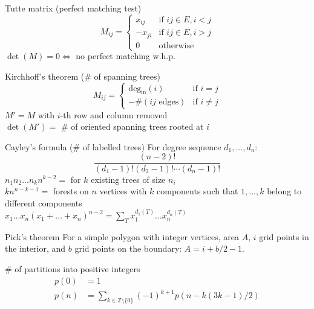 
\begin{misc}{Tutte matrix (perfect matching test)}
	\begin{equation*}
		M_{ij} =
			\begin{cases}
				x_{ij} & \text{if } ij \in E, i < j \\
				-x_{ji} & \text{if } ij \in E, i > j \\
				0 & \text{otherwise}
			\end{cases}
	\end{equation*}
	$\det(M) = 0 \iff $ no perfect matching w.h.p. \\
\end{misc}

\begin{misc}{Kirchhoff's theorem (\# of spanning trees)}
	\begin{equation*}
		M_{ij} =
			\begin{cases}
				\text{deg}_{\text{in}}(i) & \text{if } i = j \\
				-\#(ij\text{ edges}) & \text{if } i \neq j
			\end{cases}
	\end{equation*}
	$M' = M$ with $i$-th row and column removed \\
	$\det(M') = $ \# of oriented spanning trees rooted at $i$
\end{misc}

\begin{misc}{Cayley's formula (\# of labelled trees)}
	For degree sequence $d_1, ..., d_n$:
	\begin{equation*}
		\frac{(n-2)!}{(d_1 - 1)!(d_2 - 1)! \cdots (d_n - 1)!}
	\end{equation*}
	$n_1n_2...n_kn^{k-2} =$ for $k$ existing trees of size $n_i$ \\
	$kn^{n-k-1} =$ forests on $n$ vertices with $k$ components such that $1, ..., k$ belong to different components \\
	$x_1 \ldots x_n(x_1+ \ldots +x_n)^{n-2} = \sum_T x_1^{d_1(T)} \ldots x_n^{d_n(T)}$
\end{misc}

\begin{misc}{Pick's theorem}
	For a simple polygon with integer vertices, area $A$, $i$ grid points in the interior, and $b$ grid points on the boundary:
	$A=i+b/2-1$.
\end{misc}

\begin{misc}{\# of partitions into positive integers}
	\begin{align*}
		p(0) &= 1 \\
		p(n) &= \sum_{k \in \mathbb{Z} \setminus \{0\}} (-1)^{k+1} p(n - k(3k-1)/2)
	\end{align*}
\end{misc}

